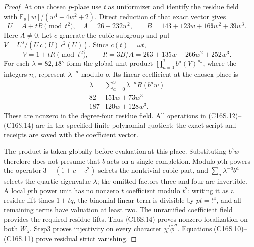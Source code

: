 \begin{proof}
At one chosen $p$-place use $t$ as uniformizer and identify
the residue field with
$\mathbb F_p[w]/(w^4+4w^2+2)$.  Direct reduction of that
exact vector gives
\[
 U=A+tB\pmod{t^2},\quad
 A=26+232w^2,\qquad B=143+123w+169w^2+39w^3.
 \tag{C16S.12}
\]
Here $A\ne0$.  Let $c$ generate the cubic subgroup and put
$V=U^3/(U\,c(U)\,c^2(U))$.  Since $c(t)=\omega t$,
\[
 V=1+tR\pmod{t^2},\qquad
 R=3B/A=263+135w+266w^2+252w^3.
 \tag{C16S.13}
\]
For each $\lambda=82,187$ form the global unit product
$\prod_{a=0}^3 b^a(V)^{n_a}$, where the integers $n_a$
represent $\lambda^{-a}$ modulo $p$.
Its linear coefficient at the chosen place is
\[
 \begin{array}{c|c}
 \lambda&\sum_{a=0}^3\lambda^{-a}R(b^a w)\\\hline
 82&151w+73w^3\\
 187&120w+128w^3.
 \end{array}\tag{C16S.14}
\]
These are nonzero in the degree-four residue field.
All operations in (C16S.12)--(C16S.14) are in the specified
finite polynomial quotient; the exact script and receipts
are saved with the coefficient vector.

The product is taken globally before evaluation at this
place.  Substituting $b^a w$ therefore does not presume
that $b$ acts on a single completion.  Modulo $p$th powers
the operator $3-(1+c+c^2)$ selects the nontrivial cubic
part, and $\sum_a\lambda^{-a}b^a$ selects the quartic
eigenvalue $\lambda$; the omitted factors three and four
are invertible.  A local $p$th power unit has no nonzero
$t$ coefficient modulo $t^2$: writing it as a residue
lift times $1+tq$, the binomial linear term is divisible
by $pt=t^4$, and all remaining terms have valuation at
least two.  The unramified coefficient field provides
the required residue lifts.
Thus (C16S.14) proves nonzero localization on both
$W_\lambda$.  Step3 proves injectivity on every character
$\bar\chi^j\bar\phi^\sigma$.  Equations
(C16S.10)--(C16S.11) prove residual strict vanishing.


\end{proof}
